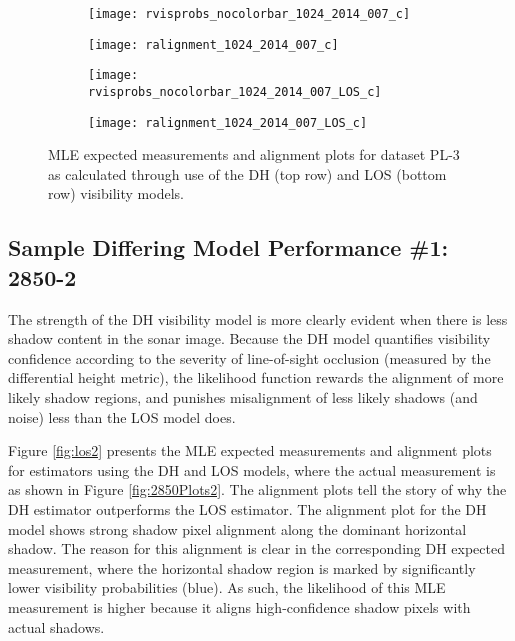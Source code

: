 \begin{figure} [h!]
	\centering
	\begin{subfigure}[b]{0.48\textwidth}
                \texttt{[image: rvisprobs\_nocolorbar\_1024\_2014\_007\_c]}
                \caption{}
	\end{subfigure}
  	\centering
	\begin{subfigure}[b]{0.48\textwidth}
                \texttt{[image: ralignment\_1024\_2014\_007\_c]}
		\caption{}
  	\end{subfigure}
  	
  	\centering
	\begin{subfigure}[b]{0.48\textwidth}
                \texttt{[image: rvisprobs\_nocolorbar\_1024\_2014\_007\_LOS\_c]}
		\caption{}
  	\end{subfigure}
  	\centering
	\begin{subfigure}[b]{0.48\textwidth}
                \texttt{[image: ralignment\_1024\_2014\_007\_LOS\_c]}
		\caption{}
  	\end{subfigure}
  	
	\caption{MLE expected measurements and alignment plots for dataset PL-3 as calculated through use of the DH (top row) and LOS (bottom row) visibility models.}
	\label{fig:los1}
\end{figure}

\subsection{Sample Differing Model Performance \#1: 2850-2}
\label{rov.LOS.28502}

The strength of the DH visibility model is more clearly evident when there is less shadow content in the sonar image.
Because the DH model quantifies visibility confidence according to the severity of line-of-sight occlusion (measured by the differential height metric), the likelihood function rewards the alignment of more likely shadow regions, and punishes misalignment of less likely shadows (and noise) less than the LOS model does.

Figure \ref{fig:los2} presents the MLE expected measurements and alignment plots for estimators using the DH and LOS models, where the actual measurement is as shown in Figure \ref{fig:2850Plots2}.
The alignment plots tell the story of why the DH estimator outperforms the LOS estimator.
The alignment plot for the DH model shows strong shadow pixel alignment along the dominant horizontal shadow. 
The reason for this alignment is clear in the corresponding DH expected measurement, where the horizontal shadow region is marked by significantly lower visibility probabilities (blue).
As such, the likelihood of this MLE measurement is higher because it aligns high-confidence shadow pixels with actual shadows.

